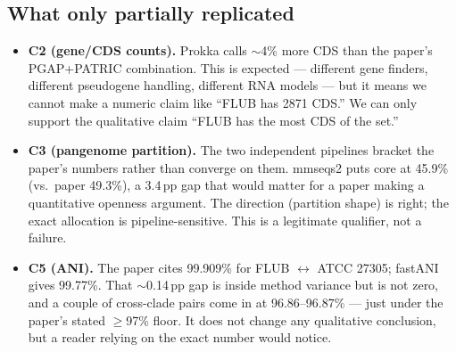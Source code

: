 \documentclass[11pt,letterpaper]{article}
\begin{document}
\subsection{What only partially replicated}
\begin{itemize}[leftmargin=1.2em]
  \item \textbf{C2 (gene/CDS counts).} Prokka calls $\sim$4\% more CDS than the paper's PGAP+PATRIC combination. This is expected --- different gene finders, different pseudogene handling, different RNA models --- but it means we cannot make a numeric claim like ``FLUB has 2871 CDS.'' We can only support the qualitative claim ``FLUB has the most CDS of the set.''
  \item \textbf{C3 (pangenome partition).} The two independent pipelines bracket the paper's numbers rather than converge on them. mmseqs2 puts core at 45.9\% (vs.\ paper 49.3\%), a 3.4\,pp gap that would matter for a paper making a quantitative openness argument. The direction (partition shape) is right; the exact allocation is pipeline-sensitive. This is a legitimate qualifier, not a failure.
  \item \textbf{C5 (ANI).} The paper cites 99.909\% for FLUB $\leftrightarrow$ ATCC 27305; fastANI gives 99.77\%. That $\sim$0.14\,pp gap is inside method variance but is not zero, and a couple of cross-clade pairs come in at 96.86--96.87\% --- just under the paper's stated $\ge$97\% floor. It does not change any qualitative conclusion, but a reader relying on the exact number would notice.
\end{itemize}
\end{document}
